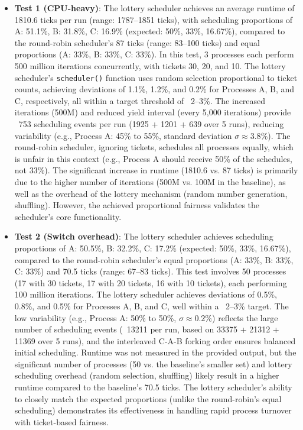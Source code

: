 \documentclass{article}
\begin{document}
\begin{itemize}
    \item \textbf{Test 1 (CPU-heavy)}: The lottery scheduler achieves an average runtime of 1810.6 ticks per run (range: 1787–1851 ticks), with scheduling proportions of A: 51.1\%, B: 31.8\%, C: 16.9\% (expected: 50\%, 33\%, 16.67\%), compared to the round-robin scheduler’s 87 ticks (range: 83–100 ticks) and equal proportions (A: 33\%, B: 33\%, C: 33\%). In this test, 3 processes each perform 500 million iterations concurrently, with tickets 30, 20, and 10. The lottery scheduler’s \texttt{scheduler()} function uses random selection proportional to ticket counts, achieving deviations of 1.1\%, 1.2\%, and 0.2\% for Processes A, B, and C, respectively, all within a target threshold of ~2–3\%. The increased iterations (500M) and reduced yield interval (every 5,000 iterations) provide ~753 scheduling events per run (1925 + 1201 + 639 over 5 runs), reducing variability (e.g., Process A: 45\% to 55\%, standard deviation $\sigma \approx 3.8\%$). The round-robin scheduler, ignoring tickets, schedules all processes equally, which is unfair in this context (e.g., Process A should receive 50\% of the schedules, not 33\%). The significant increase in runtime (1810.6 vs. 87 ticks) is primarily due to the higher number of iterations (500M vs. 100M in the baseline), as well as the overhead of the lottery mechanism (random number generation, shuffling). However, the achieved proportional fairness validates the scheduler’s core functionality.
    
    \item \textbf{Test 2 (Switch overhead)}: The lottery scheduler achieves scheduling proportions of A: 50.5\%, B: 32.2\%, C: 17.2\% (expected: 50\%, 33\%, 16.67\%), compared to the round-robin scheduler’s equal proportions (A: 33\%, B: 33\%, C: 33\%) and 70.5 ticks (range: 67–83 ticks). This test involves 50 processes (17 with 30 tickets, 17 with 20 tickets, 16 with 10 tickets), each performing 100 million iterations. The lottery scheduler achieves deviations of 0.5\%, 0.8\%, and 0.5\% for Processes A, B, and C, well within a ~2–3\% target. The low variability (e.g., Process A: 50\% to 50\%, $\sigma \approx 0.2\%$) reflects the large number of scheduling events (~13211 per run, based on 33375 + 21312 + 11369 over 5 runs), and the interleaved C-A-B forking order ensures balanced initial scheduling. Runtime was not measured in the provided output, but the significant number of processes (50 vs. the baseline’s smaller set) and lottery scheduling overhead (random selection, shuffling) likely result in a higher runtime compared to the baseline’s 70.5 ticks. The lottery scheduler’s ability to closely match the expected proportions (unlike the round-robin’s equal scheduling) demonstrates its effectiveness in handling rapid process turnover with ticket-based fairness.
    

\end{itemize}
\end{document}
